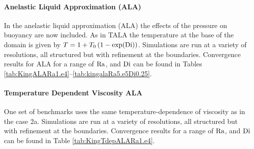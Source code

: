 \paragraph{Anelastic Liquid Approximation (ALA)}
In the anelastic liquid approximation (ALA) the effects of the
pressure on buoyancy are now included. %
As in TALA the temperature at the base of the domain is given by $T =
1 + T_0\left(1 - \exp(\mathrm{Di})\right)$.  Simulations are run at a variety
of resolutions, all structured but with refinement at the boundaries.
Convergence results for ALA for a range of
$\mathrm{Ra}$, and $\mathrm{Di}$  can be found in Tables \ref{tab:KingALARa1.e4}--\ref{tab:kingalaRa5.e5Di0.25}.



\paragraph{Temperature Dependent Viscosity ALA}
One set of benchmarks uses the same temperature-dependence of
viscosity as in the \citet{BlankenbachGJI1989} case 2a.
%
Simulations are run at a variety of resolutions, all structured but
with refinement at the boundaries.  Convergence results for  a range
of $\mathrm{Ra}$, and $\mathrm{Di}$  can be found in Table \ref{tab:KingTdepALARa1.e4}.

